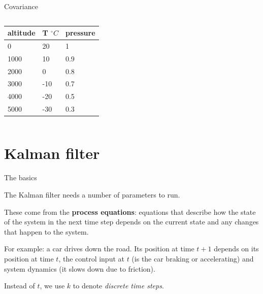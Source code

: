 \documentclass[compress]{beamer}
\begin{document}
\begin{frame}{Covariance}
{    \begin{columns}
        \begin{column}{0.4\linewidth}
            \begin{tabular}{@{}lll@{}}
                \toprule
                altitude & T $^{\circ}C$ & pressure \\ \midrule
                0        & 20          & 1            \\
                1000     & 10          & 0.9          \\
                2000     & 0           & 0.8          \\
                3000     & -10         & 0.7          \\
                4000     & -20         & 0.5          \\
                5000     & -30         & 0.3          \\ \bottomrule
            \end{tabular}

        \end{column}
        \begin{column}{0.6\linewidth}

        \end{column}
    \end{columns}
}
\end{frame}

\section{Kalman filter}

\begin{frame}{The basics}

The Kalman filter needs a number of parameters to run.

These come from the \textbf{process equations}: equations that describe
how the state of the system in the next time step depends on the
current state and any changes that happen to the system.

\pause

For example: a car drives down the road. Its position at time
$t+1$ depends on its position at time $t$, the control input
at $t$ (is the car braking or accelerating) and system dynamics
(it slows down due to friction).

\pause

    Instead of $t$, we use $k$ to denote \emph{discrete time steps}.

\end{frame}
\end{document}
